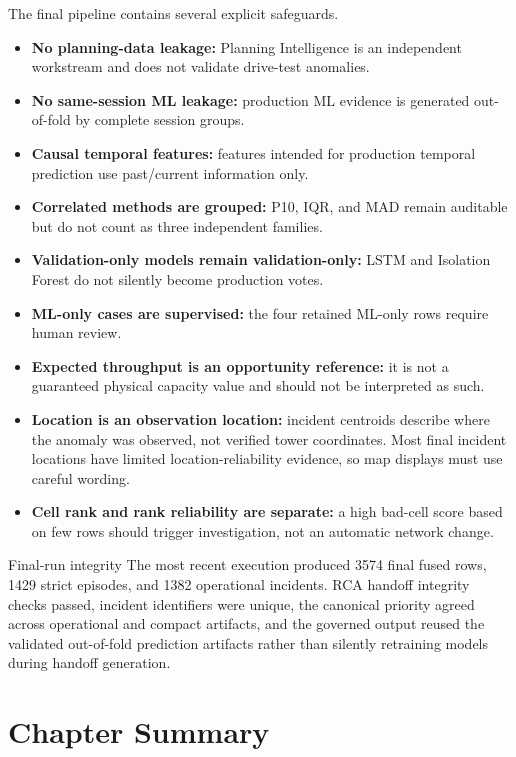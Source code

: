 The final pipeline contains several explicit safeguards.

\begin{itemize}
  \item \textbf{No planning-data leakage:} Planning Intelligence is an independent workstream and does not validate drive-test anomalies.
  \item \textbf{No same-session ML leakage:} production ML evidence is generated out-of-fold by complete session groups.
  \item \textbf{Causal temporal features:} features intended for production temporal prediction use past/current information only.
  \item \textbf{Correlated methods are grouped:} P10, IQR, and MAD remain auditable but do not count as three independent families.
  \item \textbf{Validation-only models remain validation-only:} LSTM and Isolation Forest do not silently become production votes.
  \item \textbf{ML-only cases are supervised:} the four retained ML-only rows require human review.
  \item \textbf{Expected throughput is an opportunity reference:} it is not a guaranteed physical capacity value and should not be interpreted as such.
  \item \textbf{Location is an observation location:} incident centroids describe where the anomaly was observed, not verified tower coordinates. Most final incident locations have limited location-reliability evidence, so map displays must use careful wording.
  \item \textbf{Cell rank and rank reliability are separate:} a high bad-cell score based on few rows should trigger investigation, not an automatic network change.
\end{itemize}

\begin{successbox}{Final-run integrity}
The most recent execution produced \num{3574} final fused rows, \num{1429} strict episodes, and \num{1382} operational incidents. RCA handoff integrity checks passed, incident identifiers were unique, the canonical priority agreed across operational and compact artifacts, and the governed output reused the validated out-of-fold prediction artifacts rather than silently retraining models during handoff generation.
\end{successbox}

\section{Chapter Summary}

